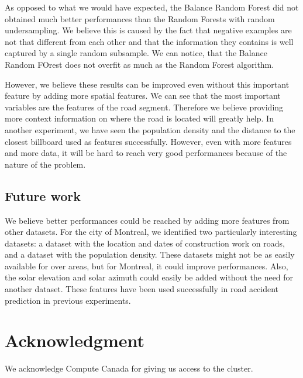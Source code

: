\documentclass[conference]{IEEEtran}
\begin{document}
As opposed to what we would have expected, the Balance Random Forest did not obtained much better performances than the Random Forests with random undersampling. We believe this is caused by the fact that negative examples are not that different from each other and that the information they contains is well captured by a single random subsample. We can notice, that the Balance Random FOrest does not overfit as much as the Random Forest algorithm.

However, we believe these results can be improved even without this important feature by adding more spatial features. We can see that the most important variables are the features of the road segment. Therefore we believe providing more context information on where the road is located will greatly help. In another experiment, we have seen the population density and the distance to the closest billboard used as features successfully. However, even with more features and more data, it will be hard to reach very good performances because of the nature of the problem.

\subsection{Future work}
We believe better performances could be reached by adding more features from other datasets. For the city of Montreal, we identified two particularly interesting datasets: a dataset with the location and dates of construction work on roads, and a dataset with the population density. These datasets might not be as easily available for over areas, but for Montreal, it could improve performances. Also, the solar elevation and solar azimuth could easily be added without the need for another dataset. These features have been used successfully in road accident prediction in previous experiments.

\section*{Acknowledgment}

We acknowledge Compute Canada for giving us access to the cluster.



\end{document}
